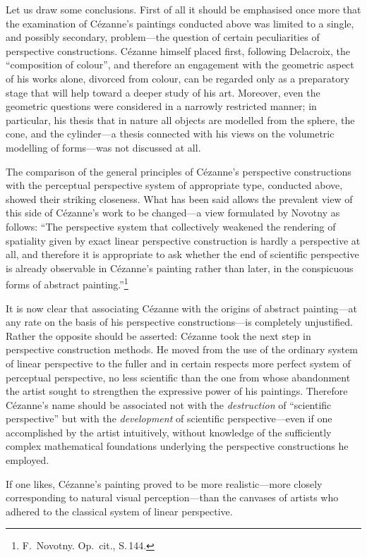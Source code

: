 Let us draw some conclusions. First of all it should be emphasised once more that
the examination of Cézanne's paintings conducted above was limited to a single, and
possibly secondary, problem---the question of certain peculiarities of perspective
constructions. Cézanne himself placed first, following Delacroix, the ``composition
of colour'', and therefore an engagement with the geometric aspect of his works
alone, divorced from colour, can be regarded only as a preparatory stage that will
help toward a deeper study of his art. Moreover, even the geometric questions were
considered in a narrowly restricted manner; in particular, his thesis that in nature
all objects are modelled from the sphere, the cone, and the cylinder---a thesis
connected with his views on the volumetric modelling of forms---was not discussed
at all.

The comparison of the general principles of Cézanne's perspective constructions with
the perceptual perspective system of appropriate type, conducted above, showed their
striking closeness. What has been said allows the prevalent view of this side of
Cézanne's work to be changed---a view formulated by Novotny as follows:
``The perspective system that collectively weakened the rendering of spatiality given
by exact linear perspective construction is hardly a perspective at all, and therefore
it is appropriate to ask whether the end of scientific perspective is already
observable in Cézanne's painting rather than later, in the conspicuous forms of
abstract painting.''\footnote{F.~Novotny. Op.~cit., S.\,144.}


It is now clear that associating Cézanne with the origins of abstract painting---at
any rate on the basis of his perspective constructions---is completely unjustified.
Rather the opposite should be asserted: Cézanne took the next step in perspective
construction methods. He moved from the use of the ordinary system of linear
perspective to the fuller and in certain respects more perfect system of perceptual
perspective, no less scientific than the one from whose abandonment the artist sought
to strengthen the expressive power of his paintings. Therefore Cézanne's name should
be associated not with the \emph{destruction} of ``scientific perspective'' but with
the \emph{development} of scientific perspective---even if one accomplished by the
artist intuitively, without knowledge of the sufficiently complex mathematical
foundations underlying the perspective constructions he employed.

If one likes, Cézanne's painting proved to be more realistic---more closely
corresponding to natural visual perception---than the canvases of artists who
adhered to the classical system of linear perspective.

